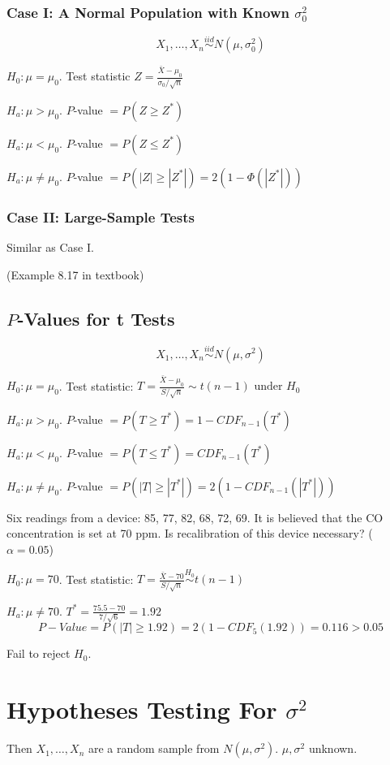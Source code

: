 \subsubsection{Case I: A Normal Population with Known $\sigma_0^2$}
\[X_1,\dots,X_n \overset{iid}{\sim} N(\mu,\sigma_0^2)\]

$H_0:\mu=\mu_0$. Test statistic $Z=\frac{\bar{X}-\mu_0}{\sigma_0/\sqrt{n}}$

$H_a:\mu>\mu_0$. $P$-value $= P(Z \geq Z^*)$

$H_a:\mu<\mu_0$. $P$-value $= P(Z \leq Z^*)$

$H_a:\mu\neq\mu_0$. $P$-value $= P(|Z| \geq |Z^*|)=2(1-\Phi(|Z^*|))$

\subsubsection{Case II: Large-Sample Tests}
Similar as Case I.

\begin{exmp}
(Example 8.17 in textbook)
\end{exmp}

\subsection{$P$-Values for t Tests}
\[X_1,\dots,X_n \overset{iid}{\sim} N(\mu,\sigma^2)\]

$H_0:\mu=\mu_0$. Test statistic: $T=\frac{\bar{X}-\mu_0}{S/\sqrt{n}} \sim t(n-1) \text{ under } H_0$

$H_a:\mu>\mu_0$. $P$-value $= P(T \geq T^*)=1-CDF_{n-1}(T^*)$

$H_a:\mu<\mu_0$. $P$-value $= P(T \leq T^*)=CDF_{n-1}(T^*)$

$H_a:\mu\neq\mu_0$. $P$-value $= P(|T| \geq |T^*|)=2(1-CDF_{n-1}(|T^*|))$

\begin{exmp}
Six readings from a device: 85, 77, 82, 68, 72, 69. It is believed that the CO concentration is set at 70 ppm. Is recalibration of this device necessary? ($\alpha=0.05$)

$H_0:\mu=70$. Test statistic: $T=\frac{\bar{X}-70}{S/\sqrt{n}} \overset{H_0}{\sim} t(n-1) $

$H_a:\mu\neq 70$. $T^*=\frac{75.5-70}{7/\sqrt{6}}=1.92 $
\[P-Value=P(|T|\geq 1.92)=2(1-CDF_5(1.92))=0.116>0.05\]

Fail to reject $H_0$.
\end{exmp}

\section{Hypotheses Testing For $\sigma^2$}
Then $X_1,\dots,X_n$ are a random sample from $N(\mu,\sigma^2)$. $\mu,\sigma^2$ unknown.

